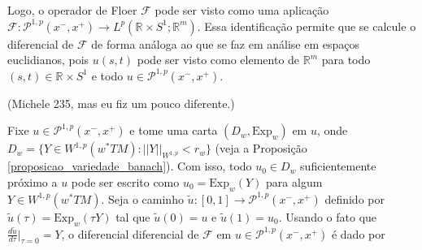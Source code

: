 \documentclass[12pt]{book}
\newcommand{\caminhosexponenciaisconectantes}[2]{\mathcal{P}^{1,p}(#1, #2)}
\newcommand{\caminhosexponenciaisconectantespadrao}{\caminhosexponenciaisconectantes{x^{-}}{x^{+}}}
\newcommand{\circulo}{S^{1}}
\newcommand{\derivada}[2]{\frac{d #1}{d #2}}
\newcommand{\espacoLpcontradominio}[2]{L^{p}(#1;#2)}
\newcommand{\espacosobolev}[1]{W^{1,p}(#1)}
\newcommand{\Exp}{\text{Exp}}
\newcommand{\intervalo}{[0,1]}
\newcommand{\operadorFloer}{\mathcal{F}}
\newcommand{\normaWp}[1]{||#1||_{W^{1,p}}}
\newcommand{\pullbackfibradotangente}[2]{#1^{*}T#2}
\newcommand{\pullbackfibradotangenteM}[1]{\pullbackfibradotangente{#1}{M}}
\newcommand{\retacartesianocirculo}{\real{} \times \circulo}
\newcommand{\real}[1]{\mathbb{R}^{#1}}
\newcommand{\aviso}[1]{{\color{violet}(#1)}}
\begin{document}
	Logo, o operador de Floer $\operadorFloer$ pode ser visto como uma aplicação $\operadorFloer: \caminhosexponenciaisconectantespadrao\to \espacoLpcontradominio{\retacartesianocirculo}{\real{m}}$. Essa identificação permite que se calcule o diferencial de $\operadorFloer$ de forma análoga ao que se faz em análise em espaços euclidianos, pois $u(s,t)$ pode ser visto como elemento de $\real{m}$ para todo $(s,t)\in \retacartesianocirculo$ e todo $u\in \caminhosexponenciaisconectantespadrao$.
	
	
	\aviso{Michele 235, mas eu fiz um pouco diferente.}
	
	
	Fixe $u \in \caminhosexponenciaisconectantespadrao$ e tome uma carta $(D_{w}, \Exp_{w})$ em $u$, onde $D_{w}=\{Y \in \espacosobolev{\pullbackfibradotangenteM{w}}: \normaWp{Y}<r_{w} \}$ (veja a Proposição \ref{proposicao_variedade_banach}). Com isso, todo $u_{0} \in D_{w}$ suficientemente próximo a $u$ pode ser escrito como $u_{0}=\Exp_{w}(Y)$ para algum $Y\in \espacosobolev{\pullbackfibradotangenteM{w}}$. Seja o caminho $\tilde{u}:\intervalo\to \caminhosexponenciaisconectantespadrao$ definido por $\tilde{u}(\tau)=\Exp_{w}(\tau Y)$ tal que $\tilde{u}(0) = u$ e $\tilde{u}(1) = u_{0}$. Usando o fato que $\derivada{\tilde{u}}{\tau}|_{\tau=0}=Y$, o diferencial diferencial de $\operadorFloer$ em $u \in \caminhosexponenciaisconectantespadrao$ é dado por
\end{document}
